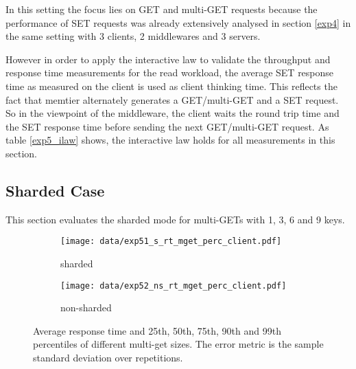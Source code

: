 \documentclass[report.tex]{subfiles}
\begin{document}
In this setting the focus lies on GET and multi-GET requests because the performance of SET requests was already extensively analysed in section \ref{exp4} in the same setting with 3 clients, 2 middlewares and 3 servers.

However in order to apply the interactive law to validate the throughput and response time measurements for the read workload, the average SET response time as measured on the client is used as client thinking time. This reflects the fact that memtier alternately generates a GET/multi-GET and a SET request. So in the viewpoint of the middleware, the client waits the round trip time and the SET response time before sending the next GET/multi-GET request. As table \ref{exp5_ilaw} shows, the interactive law holds for all measurements in this section.


\subsection{Sharded Case}

This section evaluates the sharded mode for multi-GETs with 1, 3, 6 and 9 keys.


\begin{figure}
	\begin{subfigure}[b]{.49\linewidth}
		\centering
		\texttt{[image: data/exp51\_s\_rt\_mget\_perc\_client.pdf]}
		\caption{sharded}\label{exp51_s_rt_mget_perc}
	\end{subfigure}\hfill
	\begin{subfigure}[b]{.49\linewidth}
		\centering
		\texttt{[image: data/exp52\_ns\_rt\_mget\_perc\_client.pdf]}
		\caption{non-sharded}\label{exp52_ns_rt_mget_perc}
	\end{subfigure}%
	\caption{Average response time and 25th, 50th, 75th, 90th and 99th percentiles of different multi-get sizes. The error metric is the sample standard deviation over repetitions.}\label{exp5_rt_mget_perc}
\end{figure}
\end{document}
